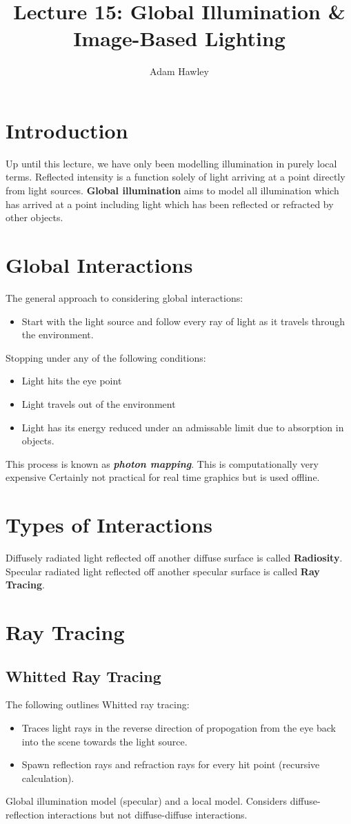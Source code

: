 \documentclass{article}
\author{Adam Hawley}
\title{Lecture 15: Global Illumination \& Image-Based Lighting}
\begin{document}
\maketitle
\tableofcontents
\newpage

\section{Introduction}
Up until this lecture, we have only been modelling illumination in purely local terms.
Reflected intensity is a function solely of light arriving at a point directly from light sources.
\textbf{Global illumination} aims to model all illumination which has arrived at a point including light which has been reflected or refracted by other objects.

\section{Global Interactions}
The general approach to considering global interactions:
\begin{itemize}
	\item Start with the light source and follow every ray of light as it travels through the environment.
\end{itemize}
Stopping under any of the following conditions:
\begin{itemize}
	\item Light hits the eye point
	\item Light travels out of the environment
	\item Light has its energy reduced under an admissable limit due to absorption in objects.
\end{itemize}
This process is known as \textbf{\textit{photon mapping}}.
This is computationally very expensive
Certainly not practical for real time graphics but is used offline.

\section{Types of Interactions}
Diffusely radiated light reflected off another diffuse surface is called \textbf{Radiosity}.
Specular radiated light reflected off another specular surface is called \textbf{Ray Tracing}.

\section{Ray Tracing}
\subsection{Whitted Ray Tracing}
The following outlines Whitted ray tracing:
\begin{itemize}
	\item Traces light rays in the reverse direction of propogation from the eye back into the scene towards the light source.
	\item Spawn reflection rays and refraction rays for every hit point (recursive calculation).
\end{itemize}
Global illumination model (specular) and a local model.
Considers diffuse-reflection interactions but not diffuse-diffuse interactions.
\end{document}
